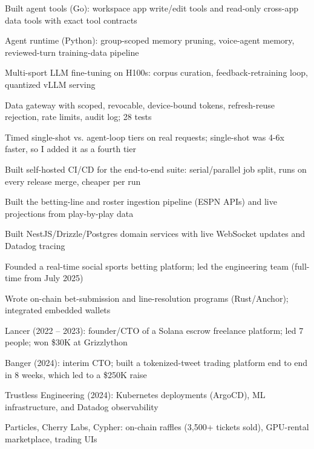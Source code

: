 \documentclass[print]{jack-resume}
\begin{document}
\begin{tightemize}
    \item Built agent tools (Go): workspace app write/edit tools and read-only cross-app data tools with exact tool contracts
    \item Agent runtime (Python): group-scoped memory pruning, voice-agent memory, reviewed-turn training-data pipeline
    \item Multi-sport LLM fine-tuning on H100s: corpus curation, feedback-retraining loop, quantized vLLM serving
    \item Data gateway with scoped, revocable, device-bound tokens, refresh-reuse rejection, rate limits, audit log; 28 tests
    \item Timed single-shot vs. agent-loop tiers on real requests; single-shot was 4-6x faster, so I added it as a fourth tier
    \item Built self-hosted CI/CD for the end-to-end suite: serial/parallel job split, runs on every release merge, cheaper per run
\end{tightemize}
\sectionsep

\begin{tightemize}
    \item Built the betting-line and roster ingestion pipeline (ESPN APIs) and live projections from play-by-play data
    \item Built NestJS/Drizzle/Postgres domain services with live WebSocket updates and Datadog tracing
    \item Founded a real-time social sports betting platform; led the engineering team (full-time from July 2025)
    \item Wrote on-chain bet-submission and line-resolution programs (Rust/Anchor); integrated embedded wallets
\end{tightemize}
\sectionsep

\begin{tightemize}
    \item Lancer (2022 – 2023): founder/CTO of a Solana escrow freelance platform; led 7 people; won \$30K at Grizzlython
    \item Banger (2024): interim CTO; built a tokenized-tweet trading platform end to end in 8 weeks, which led to a \$250K raise
    \item Trustless Engineering (2024): Kubernetes deployments (ArgoCD), ML infrastructure, and Datadog observability
    \item Particles, Cherry Labs, Cypher: on-chain raffles (3,500+ tickets sold), GPU-rental marketplace, trading UIs
\end{tightemize}
\sectionsep
\end{document}
